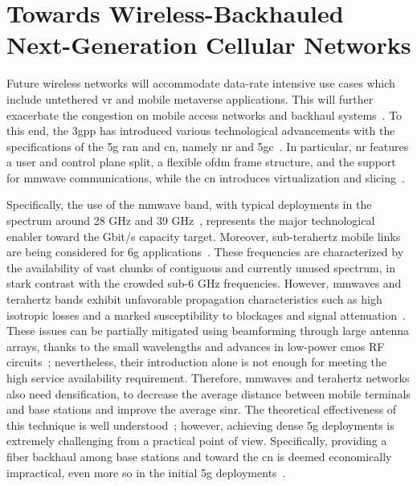 \chapter{Towards Wireless-Backhauled Next-Generation Cellular Networks}
\label{ch:iab}


Future wireless networks will accommodate data-rate intensive use cases which include untethered \gls{vr} and mobile metaverse applications. This will further exacerbate the congestion on mobile access networks and backhaul systems~\cite{holo1}.
To this end, the \gls{3gpp} has introduced various technological advancements with the specifications of the \gls{5g} \gls{ran} and \gls{cn}, namely \gls{nr} and \gls{5gc}~\cite{3gpp_38_300}. In particular, \gls{nr} features a user and control plane split, a flexible \gls{ofdm} frame structure, and the support for \gls{mmwave} communications, while the \gls{cn} introduces virtualization and slicing~\cite{yousaf2017nfv}. 

Specifically, the use of the \gls{mmwave} band, with typical deployments in the spectrum around 28 GHz and 39 GHz~\cite{shafi2017deployment}, represents the major technological enabler toward the Gbit/s capacity target. Moreover, sub-terahertz mobile links are being considered for \gls{6g} applications~\cite{polese2020toward,8869705}. 
These frequencies are characterized by the availability of vast chunks of contiguous and currently unused spectrum, in stark contrast with the crowded sub-6 GHz frequencies. However, \glspl{mmwave} and terahertz bands exhibit unfavorable propagation characteristics such as high isotropic losses and a marked susceptibility to blockages and signal attenuation~\cite{khan2011mmwave, rangan2014millimeter}.
These issues can be partially mitigated using beamforming through large antenna arrays, thanks to the small wavelengths and advances in low-power \gls{cmos} RF circuits~\cite{hemadeh2017millimeter}; nevertheless, their introduction alone is not enough for meeting the high service availability requirement. 
Therefore, \glspl{mmwave} and terahertz networks also need densification, to decrease the average distance between mobile terminals and base stations and improve the average \gls{sinr}. The theoretical effectiveness of this technique is well understood~\cite{gomez2017capacity}; however, achieving dense \gls{5g} deployments is extremely challenging from a practical point of view. Specifically, providing a fiber backhaul among base stations and toward the \gls{cn} is deemed economically impractical, even more so in the initial \gls{5g} deployments~\cite{polese2020integrated}.

